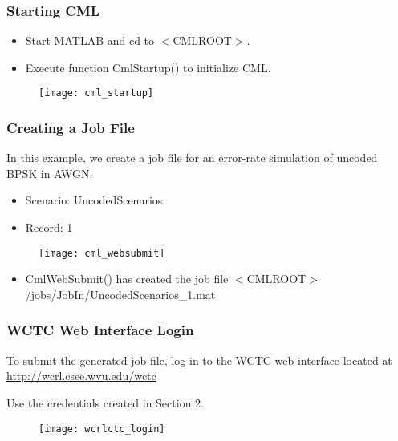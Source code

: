 \begin{frame}
  \frametitle{ Starting CML }

  \begin{itemize}
  \item Start MATLAB and cd to $<$CMLROOT$>$.
  \item Execute function CmlStartup() to initialize CML.
  \end{itemize}

  \begin{figure}
    \centering
    \texttt{[image: cml\_startup]}
  \end{figure}

\end{frame}




\begin{frame}
  \frametitle{ Creating a Job File }

  In this example, we create a job file for an error-rate simulation of uncoded BPSK in AWGN.
  \begin{itemize}
  \item Scenario: UncodedScenarios
  \item Record: 1
  \end{itemize}

  \begin{figure}
    \centering
    \texttt{[image: cml\_websubmit]}
  \end{figure}

  \begin{itemize}
  \item CmlWebSubmit() has created the job file $<$CMLROOT$>$/jobs/JobIn/UncodedScenarios\_1.mat
  \end{itemize}

\end{frame}




\begin{frame}
  \frametitle{WCTC Web Interface Login}

  \begin{itemize_loose}
  \item To submit the generated job file, log in to the WCTC web interface located at
    \\ \url{http://wcrl.csee.wvu.edu/wctc}
  \item Use the credentials created in Section 2.
  \end{itemize_loose}

  \centering
  \begin{figure}
    \texttt{[image: wcrlctc\_login]}
  \end{figure}

\end{frame}




